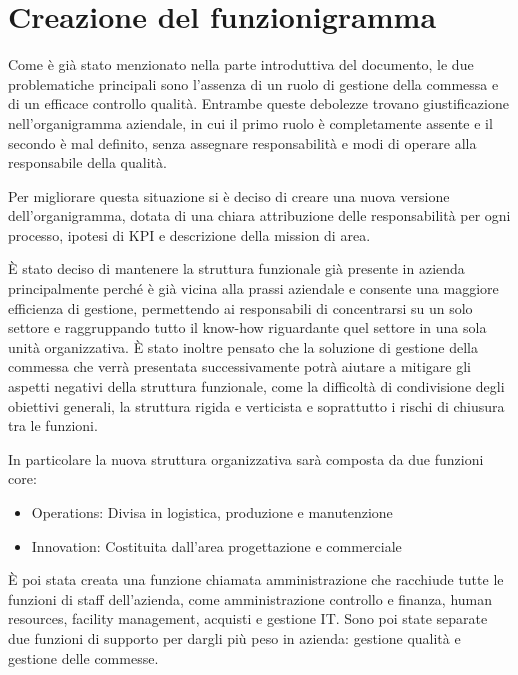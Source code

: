 \section{Creazione del funzionigramma}
\begin{multicols}{2}
	Come è già stato menzionato nella parte introduttiva del documento, le due problematiche principali sono l’assenza di un ruolo di gestione della commessa e di un efficace controllo qualità. Entrambe queste debolezze trovano giustificazione nell’organigramma aziendale, in cui il primo ruolo è completamente assente e il secondo è mal definito, senza assegnare responsabilità e modi di operare alla responsabile della qualità.

	Per migliorare questa situazione si è deciso di creare una nuova versione dell'organigramma, dotata di una chiara attribuzione delle responsabilità per ogni processo, ipotesi di KPI e descrizione della mission di area.

	È stato deciso di mantenere la struttura funzionale già presente in azienda principalmente perché è già vicina alla prassi aziendale e consente una maggiore efficienza di gestione, permettendo ai responsabili di concentrarsi su un solo settore e raggruppando tutto il know-how riguardante quel settore in una sola unità organizzativa. È stato inoltre pensato che la soluzione di gestione della commessa che verrà presentata successivamente potrà aiutare a mitigare gli aspetti negativi della struttura funzionale, come la difficoltà di condivisione degli obiettivi generali, la struttura rigida e verticista e soprattutto i rischi di chiusura tra le funzioni.

	In particolare la nuova struttura organizzativa sarà composta da due funzioni core:

	\begin{itemize}
		\item Operations: Divisa in logistica, produzione e manutenzione
		\item Innovation: Costituita dall'area progettazione e commerciale
	\end{itemize}

	È poi stata creata una funzione chiamata amministrazione che racchiude tutte le funzioni di staff dell’azienda, come amministrazione controllo e finanza, human resources, facility management, acquisti e gestione IT. Sono poi state separate due funzioni di supporto per dargli più peso in azienda: gestione qualità e gestione delle commesse.
\end{multicols}

